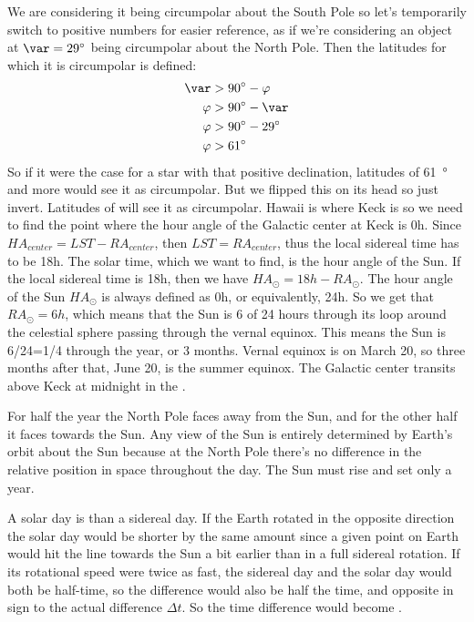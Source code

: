 \documentclass{homework}
\begin{document}
\begin{alphaparts}
    \questionpart We are considering it being circumpolar about the South Pole so let's temporarily switch to positive numbers for easier reference, as if we're considering an object at $\var = \SI{29}{\degree}$ being circumpolar about the North Pole. Then the latitudes for which it is circumpolar is defined:
    \begin{align*}
        \var    &>  \SI{90}{\degree} - \varphi  \\
        \varphi &>  \SI{90}{\degree} - \var \\
        \varphi &>  \SI{90}{\degree} - \SI{29}{\degree} \\
        \varphi &>  \SI{61}{\degree}
    \end{align*}
    So if it were the case for a star with that positive declination, latitudes of \SI{61}{\degree} and more would see it as circumpolar. But we flipped this on its head so just invert. Latitudes of  will see it as circumpolar.
    \questionpart Hawaii is where Keck is so we need to find the point where the hour angle of the Galactic center at Keck is 0h. Since $HA_{center} = LST - RA_{center}$, then $LST = RA_{center}$, thus the local sidereal time has to be 18h. The solar time, which we want to find, is the hour angle of the Sun. If the local sidereal time is 18h, then we have $HA_\odot = 18h - RA_\odot$. The hour angle of the Sun $HA_\odot$ is always defined as 0h, or equivalently, 24h. So we get that $RA_\odot = 6h$, which means that the Sun is 6 of 24 hours through its loop around the celestial sphere passing through the vernal equinox. This means the Sun is 6/24=1/4 through the year, or 3 months. Vernal equinox is on March 20, so three months after that, June 20, is the summer equinox. The Galactic center transits above Keck at midnight in the .
\end{alphaparts}

\question
For half the year the North Pole faces away from the Sun, and for the other half it faces towards the Sun. Any view of the Sun is entirely determined by Earth's orbit about the Sun because at the North Pole there's no difference in the relative position in space throughout the day. The Sun must rise and set only  a year.

\question
A solar day is  than a sidereal day. If the Earth rotated in the opposite direction the solar day would be shorter by the same amount since a given point on Earth would hit the line towards the Sun a bit earlier than in a full sidereal rotation. If its rotational speed were twice as fast, the sidereal day and the solar day would both be half-time, so the difference would also be half the time, and opposite in sign to the actual difference $\Delta t$. So the time difference would become .
\end{document}
